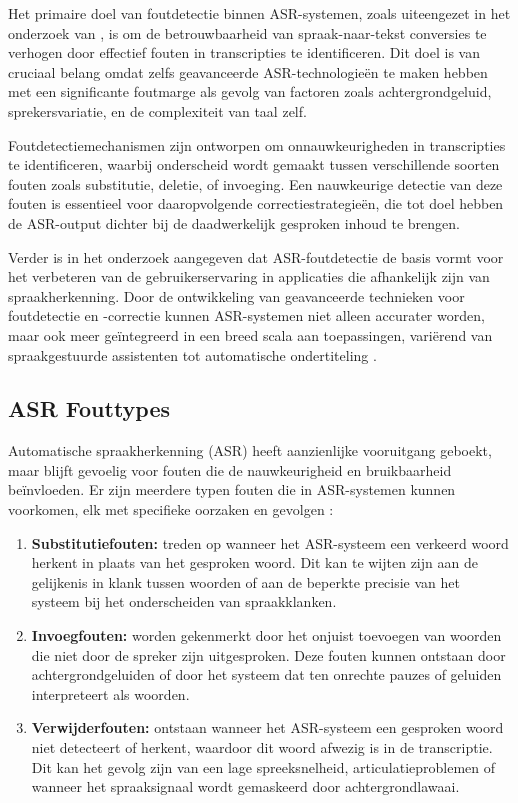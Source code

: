 Het primaire doel van foutdetectie binnen ASR-systemen, zoals uiteengezet in het onderzoek van \textcite{jiang2005confidence}, is om de betrouwbaarheid van spraak-naar-tekst conversies te verhogen door effectief fouten in transcripties te identificeren. Dit doel is van cruciaal belang omdat zelfs geavanceerde ASR-technologieën te maken hebben met een significante foutmarge als gevolg van factoren zoals achtergrondgeluid, sprekersvariatie, en de complexiteit van taal zelf.

Foutdetectiemechanismen zijn ontworpen om onnauwkeurigheden in transcripties te identificeren, waarbij onderscheid wordt gemaakt tussen verschillende soorten fouten zoals substitutie, deletie, of invoeging. Een nauwkeurige detectie van deze fouten is essentieel voor daaropvolgende correctiestrategieën, die tot doel hebben de ASR-output dichter bij de daadwerkelijk gesproken inhoud te brengen.

Verder is in het onderzoek aangegeven dat ASR-foutdetectie de basis vormt voor het verbeteren van de gebruikerservaring in applicaties die afhankelijk zijn van spraakherkenning. Door de ontwikkeling van geavanceerde technieken voor foutdetectie en -correctie kunnen ASR-systemen niet alleen accurater worden, maar ook meer geïntegreerd in een breed scala aan toepassingen, variërend van spraakgestuurde assistenten tot automatische ondertiteling \autocite{jiang2005confidence}.

\subsection{ASR Fouttypes}
Automatische spraakherkenning (ASR) heeft aanzienlijke vooruitgang geboekt, maar blijft gevoelig voor fouten die de nauwkeurigheid en bruikbaarheid beïnvloeden. Er zijn meerdere typen fouten die in ASR-systemen kunnen voorkomen, elk met specifieke oorzaken en gevolgen \autocite{Errattahi_2018}: 

\begin{enumerate}[label=\arabic*.]
    \item \textbf{Substitutiefouten:}
    treden op wanneer het ASR-systeem een verkeerd woord herkent in plaats van het gesproken woord. Dit kan te wijten zijn aan de gelijkenis in klank tussen woorden of aan de beperkte precisie van het systeem bij het onderscheiden van spraakklanken.
    
    \item \textbf{Invoegfouten:}
    worden gekenmerkt door het onjuist toevoegen van woorden die niet door de spreker zijn uitgesproken. Deze fouten kunnen ontstaan door achtergrondgeluiden of door het systeem dat ten onrechte pauzes of geluiden interpreteert als woorden.
    
    \item \textbf{Verwijderfouten:}
    ontstaan wanneer het ASR-systeem een gesproken woord niet detecteert of herkent, waardoor dit woord afwezig is in de transcriptie. Dit kan het gevolg zijn van een lage spreeksnelheid, articulatieproblemen of wanneer het spraaksignaal wordt gemaskeerd door achtergrondlawaai.   
\end{enumerate}

